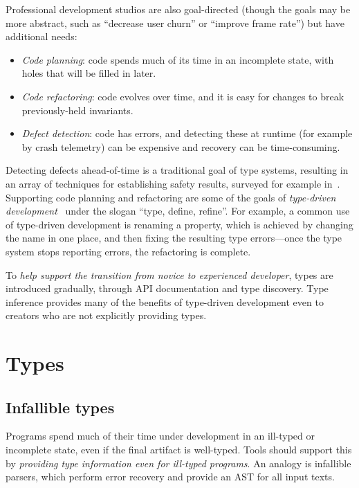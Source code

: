 \documentclass[acmsmall]{acmart}
\begin{document}
Professional development studios are also goal-directed (though the
goals may be more abstract, such as ``decrease user churn'' or
``improve frame rate'') but have additional needs:
\begin{itemize}

\item \emph{Code planning}:
  code spends much of its time in an incomplete state, with holes
  that will be filled in later.

\item \emph{Code refactoring}:
  code evolves over time, and it is easy for changes to
  break previously-held invariants.

\item \emph{Defect detection}:
  code has errors, and detecting these at runtime (for example by crash telemetry)
  can be expensive and recovery can be time-consuming.
  
\end{itemize}
Detecting defects ahead-of-time is a traditional goal of type systems,
resulting in an array of techniques for establishing safety results,
surveyed for example in~\cite{TAPL}. Supporting code planning and
refactoring are some of the goals of \emph{type-driven
development}~\cite{TDDIdris} under the slogan ``type, define,
refine''.  For example, a common use of type-driven development is renaming a
property, which is achieved by changing the name in one place,
and then fixing the resulting type errors---once the type system stops
reporting errors, the refactoring is complete.

To \emph{help support the transition from novice to experienced developer},
types are introduced gradually, through API documentation and type discovery.
Type inference provides many of the benefits of type-driven development
even to creators who are not explicitly providing types.

\section{Types}
\subsection{Infallible types}

Programs spend much of their time under development in an ill-typed or incomplete state, even if the
final artifact is well-typed. Tools should support this by \emph{providing type information even for ill-typed programs}.
An analogy is infallible parsers, which perform error recovery and provide an AST for all input texts.
\end{document}
